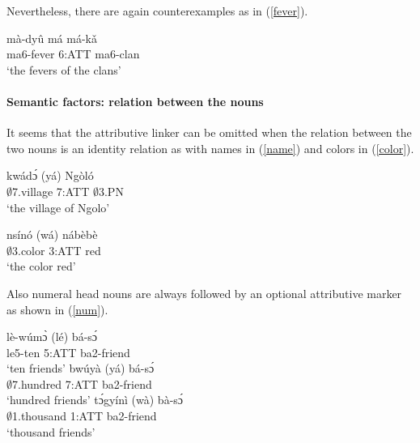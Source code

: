 \noindent Nevertheless, there are again counterexamples as in (\ref{fever}).

\begin{exe}
\ex\label{fever}
  \gll     mà-dyû má má-kǎ \\
               ma6-fever 6:ATT ma6-clan \\
    \trans `the fevers of the clans'
\end{exe}

\paragraph{Semantic factors: relation between the nouns} It seems that the attributive linker can be omitted when the relation between the two nouns is an identity relation as with names in (\ref{name}) and colors in (\ref{color}).

\begin{exe} 
\ex\label{name}
  \gll     kwádɔ́ (yá) Ngòló \\
               $\emptyset$7.village 7:ATT $\emptyset$3.PN \\
    \trans `the village of Ngolo'
\end{exe}

\begin{exe} 
\ex\label{color}
  \gll     nsínó (wá) nábèbè \\
               $\emptyset$3.color 3:ATT red \\
    \trans `the color red'
\end{exe}

\noindent Also numeral head nouns are always followed by an optional attributive marker as shown in (\ref{num}).

\begin{exe}
\ex\label{num}
\begin{xlist}
\ex \label{num1}
  \gll     lè-wúmɔ̀ (lé) bá-sɔ́ \\
               le5-ten 5:ATT ba2-friend  \\
    \trans `ten friends'
\ex\label{num2}
 \gll     bwúyà (yá) bá-sɔ́ \\
              $\emptyset$7.hundred 7:ATT ba2-friend \\
    \trans `hundred friends'
    \ex\label{num3}
 \gll     tɔ́gyínì (wà) bà-sɔ́ \\
              $\emptyset$1.thousand 1:ATT ba2-friend  \\
    \trans `thousand friends'
\end {xlist}
\end{exe}

